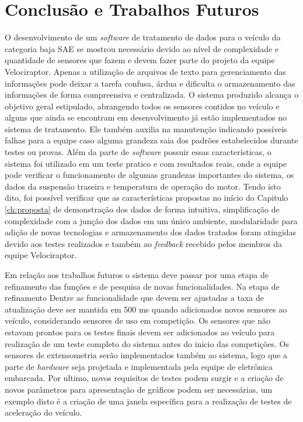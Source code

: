 \chapter{Conclusão e Trabalhos Futuros}
	\label{ch:consideracoes}
O desenvolvimento de um \textit{software} de tratamento de dados para o veículo da categoria baja SAE se mostrou necessário devido ao nível de complexidade e quantidade de sensores que fazem e devem fazer parte do projeto da equipe Velociraptor. Apenas a utilização de arquivos de texto para gerenciamento das informações pode deixar a tarefa confusa, árdua e dificulta o armazenamento das informações de forma compreensiva e centralizada. O sistema produzido alcança o objetivo geral estipulado, abrangendo todos os sensores contidos no veículo e alguns que ainda se encontram em desenvolvimento já estão implementados no sistema de tratamento. Ele também auxilia na manutenção indicando possíveis falhas para a equipe caso alguma grandeza saia dos padrões estabelecidos durante testes ou provas. Além da parte de \textit{software} possuir essas características, o sistema foi utilizado em um teste pratico e com resultados reais, onde a equipe pode verificar o funcionamento de algumas grandezas importantes do sistema, os dados da suspensão traseira e temperatura de operação do motor. Tendo isto dito, foi possível verificar que as características propostas no início do Capitulo \ref{ch:proposta} de demonstração dos dados de forma intuitiva, simplificação de complexidade com a junção dos dados em um único ambiente, modularidade para adição de novas tecnologias e armazenamento dos dados tratados foram atingidas devido aos testes realizados e também ao \textit{feedback} recebido pelos membros da equipe Velociraptor.


Em relação aos trabalhos futuros o sistema deve passar por uma etapa de refinamento das funções e de pesquisa de novas funcionalidades. Na etapa de refinamento  Dentre as funcionalidade que devem ser ajustadas a taxa de atualização deve ser mantida em 500 ms quando adicionados novos sensores ao veículo, considerando sensores de uso em competição. Os sensores que não estavam prontos para os testes finais devem ser adicionados ao veículo para realização de um teste completo do sistema antes do inicio das competições. Os sensores de extensometria serão implementados também ao sistema, logo que a parte de \textit{hardware} seja projetada e implementada pela equipe de eletrônica embarcada. Por ultimo, novos requisitos de testes podem surgir e a criação de novos parâmetros para apresentação de gráficos podem ser necessárias, um exemplo disto é a criação de uma janela específica para a realização de testes de aceleração do veículo.


